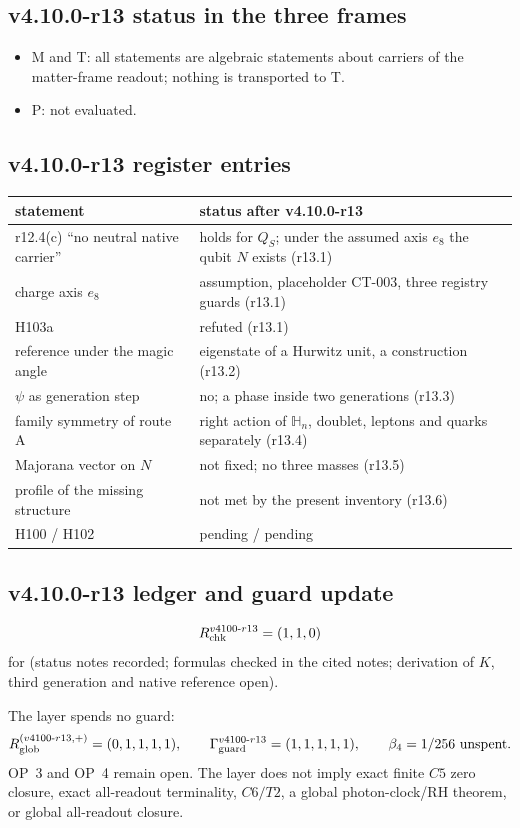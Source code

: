 \subsection*{v4.10.0-r13 status in the three frames}
\label{subsec:v4100-r13-frames}

\begin{itemize}[leftmargin=2em]
\item M and T: all statements are algebraic statements about carriers of the matter-frame readout; nothing is
transported to T.
\item P: not evaluated.
\end{itemize}

\subsection*{v4.10.0-r13 register entries}
\label{subsec:v4100-r13-register}

\begin{center}
\small
\begin{tabular}{@{}>{\raggedright\arraybackslash}p{}>{\raggedright\arraybackslash}p{}@{}}
\toprule
statement & status after v4.10.0-r13\\
\midrule
r12.4(c) ``no neutral native carrier'' & holds for \(Q_S\); under the assumed axis \(e_8\) the qubit \(N\) exists (r13.1)\\
charge axis \(e_8\) & assumption, placeholder CT-003, three registry guards (r13.1)\\
H103a & refuted (r13.1)\\
reference under the magic angle & eigenstate of a Hurwitz unit, a construction (r13.2)\\
\(\psi\) as generation step & no; a phase inside two generations (r13.3)\\
family symmetry of route A & right action of \(\mathbb H_n\), doublet, leptons and quarks separately (r13.4)\\
Majorana vector on \(N\) & not fixed; no three masses (r13.5)\\
profile of the missing structure & not met by the present inventory (r13.6)\\
H100 / H102 & pending / pending\\
\bottomrule
\end{tabular}
\end{center}

\subsection*{v4.10.0-r13 ledger and guard update}
\label{subsec:v4100-r13-ledger-guard}

\[
R_{\rm chk}^{v4100\text{-}r13}=(1,1,0)
\]
for (status notes recorded; formulas checked in the cited notes; derivation of \(K\), third generation and native reference
open).

The layer spends no guard:
\[
R_{\rm glob}^{(v4100\text{-}r13,+)}=(0,1,1,1,1),
\qquad
\Gamma_{\rm guard}^{v4100\text{-}r13}=(1,1,1,1,1),
\qquad
\beta_4=1/256\ \text{unspent}.
\]
OP~3 and OP~4 remain open.  The layer does not imply exact finite \(C5\) zero closure, exact all-readout terminality,
\(C6/T2\), a global photon-clock/RH theorem, or global all-readout closure.
